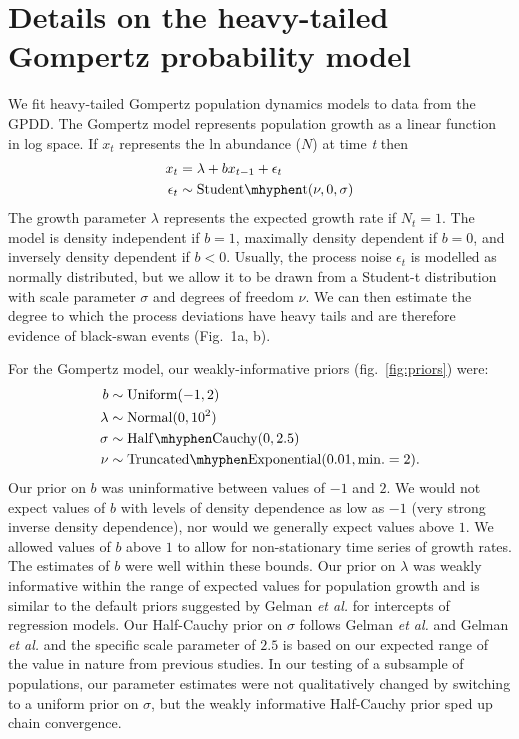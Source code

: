\documentclass[12pt]{article}
\begin{document}
\section{Details on the heavy-tailed Gompertz probability model} We fit heavy-tailed Gompertz population dynamics models to data from the GPDD. The Gompertz model represents population growth as a linear function in log space. If \(x_{t}\) represents the ln abundance (\(N\)) at time \emph{t} then
\begin{align}
x_t &= \lambda + bx_{t - 1} + \epsilon_t\\
\epsilon_t &\sim \mathrm{Student\mhyphen t}(\nu, 0, \sigma)
\end{align}
The growth parameter \(\lambda\) represents the expected growth rate if \(N_{t} = 1\). The model is density independent if \(b = 1\), maximally density dependent if \(b = 0\), and inversely density dependent if \(b < 0\). Usually, the process noise \(\epsilon_{t}\) is modelled as normally distributed, but we allow it to be drawn from a Student-t distribution with scale parameter \(\sigma\) and degrees of freedom \(\nu\). We can then estimate the degree to which the process deviations have heavy tails and are therefore evidence of black-swan events (Fig.~1a, b).

For the Gompertz model, our weakly-informative priors (fig.~\ref{fig:priors}) were:
\begin{align}
b &\sim \mathrm{Uniform}(-1, 2)\\ \lambda &\sim \mathrm{Normal}(0, 10^2)\\
\sigma &\sim \mathrm{Half\mhyphen Cauchy} (0, 2.5)\\ \nu &\sim
\mathrm{Truncated\mhyphen Exponential}(0.01, \mathrm{min.} = 2).
\end{align}
Our prior on \(b\) was uninformative between values of \(-1\) and \(2\). We would not expect values of \(b\) with levels of density dependence as low as \(-1\) (very strong inverse density dependence), nor would we generally expect values above \(1\). We allowed values of \(b\) above \(1\) to allow for non-stationary time series of growth rates. The estimates of \(b\) were well within these bounds. Our prior on \(\lambda\) was weakly informative within the range of expected values for population growth and is similar to the default priors suggested by Gelman \emph{et al.}\cite{gelman2008d} for intercepts of regression models. Our Half-Cauchy prior on \(\sigma\) follows Gelman \emph{et al.}\cite{gelman2006c} and Gelman \emph{et al.}\cite{gelman2008d} and the specific scale parameter of \(2.5\) is based on our expected range of the value in nature from previous studies\cite{connors2014}. In our testing of a subsample of populations, our parameter estimates were not qualitatively changed by switching to a uniform prior on \(\sigma\), but the weakly informative Half-Cauchy prior sped up chain convergence.
\end{document}
